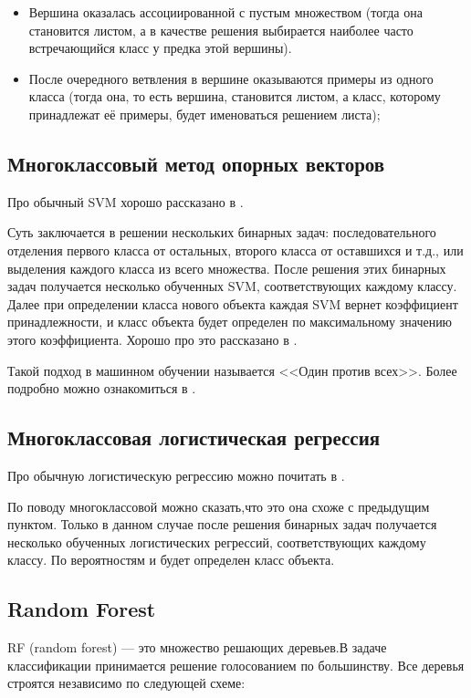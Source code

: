 \begin{itemize}
	\item Вершина оказалась ассоциированной с пустым множеством (тогда она становится листом, а в качестве решения выбирается наиболее часто встречающийся класс у предка этой вершины).
	\item После очередного ветвления в вершине оказываются примеры из одного класса (тогда она, то есть вершина, становится листом, а класс, которому принадлежат её примеры, будет именоваться решением листа);
\end{itemize}

\subsection{Многоклассовый метод опорных векторов}

Про обычный SVM хорошо рассказано в \cite{svm-vorontsov}.

Суть заключается в решении нескольких бинарных задач: последовательного отделения первого класса от остальных, второго класса от оставшихся и т.д., или выделения каждого класса из всего множества. После решения этих бинарных задач получается несколько обученных SVM, соответствующих каждому классу. Далее при определении класса нового объекта каждая SVM вернет коэффициент принадлежности, и класс объекта будет определен по максимальному значению этого коэффициента. Хорошо про это рассказано в \cite{svm-moreee}.

Такой подход в машинном обучении называется <<Один против всех>>.
Более подробно можно ознакомиться в \cite{much}.

\subsection{Многоклассовая логистическая регрессия}

Про обычную логистическую регрессию можно почитать в \cite{regression-vorontsov}.

По поводу многоклассовой можно сказать,что это она схоже с предыдущим пунктом.
Только в данном случае после решения бинарных задач получается несколько обученных логистических регрессий, соответствующих каждому классу.
По вероятностям и будет определен класс объекта.


\subsection{Random Forest}

RF (random forest) — это множество решающих деревьев.В задаче классификации принимается решение голосованием по большинству. Все деревья строятся независимо по следующей схеме:

